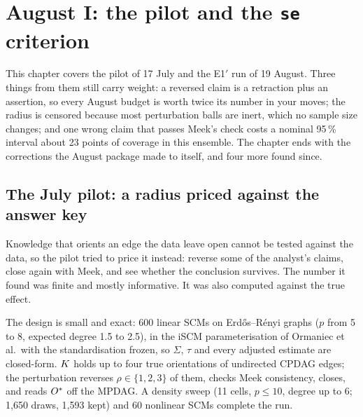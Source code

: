 \chapter{August I: the pilot and the \texttt{se} criterion}
\label{ch:pilot}

This chapter covers the pilot of 17 July and the E1$'$ run of 19 August. Three things from them still
carry weight: a reversed claim is a retraction plus an assertion, so every August budget is worth
twice its number in your moves; the radius is censored because most perturbation balls are inert,
which no sample size changes; and one wrong claim that passes Meek's check costs a nominal 95\,\%
interval about 23 points of coverage in this ensemble. The chapter ends with the corrections the
August package made to itself, and four more found since.

\begin{antes}
\end{antes}

\section{The July pilot: a radius priced against the answer key}

\begin{ideia}
Knowledge that orients an edge the data leave open cannot be tested against the data, so the pilot
tried to price it instead: reverse some of the analyst's claims, close again with Meek, and see
whether the conclusion survives. The number it found was finite and mostly informative. It was
also computed against the true effect.
\end{ideia}

The design is small and exact: 600 linear SCMs on Erd\H{o}s--R\'enyi graphs ($p$ from 5 to 8,
expected degree 1.5 to 2.5), in the iSCM parameterisation of Ormaniec et al.\ with the
standardisation frozen, so $\Sigma$, $\tau$ and every adjusted estimate are closed-form. $K$
holds up to four true orientations of undirected CPDAG edges; the perturbation reverses
$\rho \in \{1,2,3\}$ of them, checks Meek consistency, closes, and reads $O^{*}$ off the MPDAG. A
density sweep (11 cells, $p \le 10$, degree up to 6; 1,650 draws, 1,593 kept) and 60 nonlinear SCMs
complete the run.

